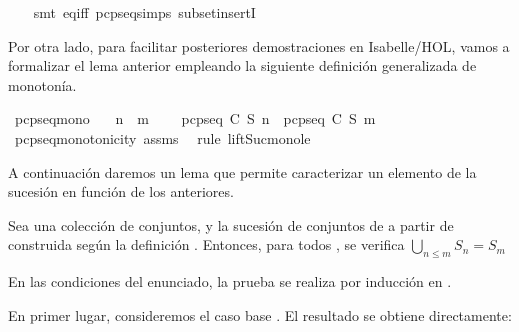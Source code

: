 \begin{isabellebody}
%
\isadelimproof
\ \ %
\endisadelimproof
%
\isatagproof
{}\isamarkupfalse%
\ {\isacharparenleft}smt\ eq{\isacharunderscore}iff\ pcp{\isacharunderscore}seq{\isachardot}simps{\isacharparenleft}{}{\isacharparenright}\ subset{\isacharunderscore}insertI{\isacharparenright}%
\endisatagproof
{\isafoldproof}%
%
\isadelimproof
%
\endisadelimproof
%
\begin{isamarkuptext}%
Por otra lado, para facilitar posteriores demostraciones en Isabelle/HOL, vamos a formalizar 
  el lema anterior empleando la siguiente definición generalizada de monotonía.%
\end{isamarkuptext}\isamarkuptrue%
\isamarkupfalse%
\ pcp{\isacharunderscore}seq{\isacharunderscore}mono{\isacharcolon}\isanewline
\ \ \ {\isachardoublequoteopen}n\ {\isasymle}\ m{\isachardoublequoteclose}\ \isanewline
\ \ \ {\isachardoublequoteopen}pcp{\isacharunderscore}seq\ C\ S\ n\ {\isasymsubseteq}\ pcp{\isacharunderscore}seq\ C\ S\ m{\isachardoublequoteclose}\isanewline
%
\isadelimproof
\ \ %
\endisadelimproof
%
\isatagproof
{}\isamarkupfalse%
\ pcp{\isacharunderscore}seq{\isacharunderscore}monotonicity\ assms\ \isamarkupfalse%
\ {\isacharparenleft}rule\ lift{\isacharunderscore}Suc{\isacharunderscore}mono{\isacharunderscore}le{\isacharparenright}%
\endisatagproof
{\isafoldproof}%
%
\isadelimproof
%
\endisadelimproof
%
\begin{isamarkuptext}%
A continuación daremos un lema que permite caracterizar un elemento de la sucesión en función 
  de los anteriores.

\begin{lema}
  Sea  una colección de conjuntos,  y  la sucesión de conjuntos de  a partir de 
   construida según la definición . Entonces, para todos ,  
  se verifica $\bigcup_{n \leq m} S_{n} = S_{m}$
\end{lema}

\begin{demostracion}
  En las condiciones del enunciado, la prueba se realiza por inducción en .

  En primer lugar, consideremos el caso base . El resultado se obtiene directamente:


\end{demostracion}
\end{isamarkuptext}
\end{isabellebody}
